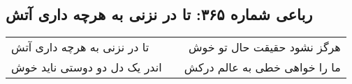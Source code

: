 \begin{center}
\section*{رباعی شماره ۳۶۵: تا در نزنی به هرچه داری آتش}
\label{sec:sh365}
\begin{longtable}{l p{0.5cm} r}
تا در نزنی به هرچه داری آتش
&&
هرگز نشود حقیقت حال تو خوش
\\
اندر یک دل دو دوستی ناید خوش
&&
ما را خواهی خطی به عالم درکش
\\
\end{longtable}
\end{center}
